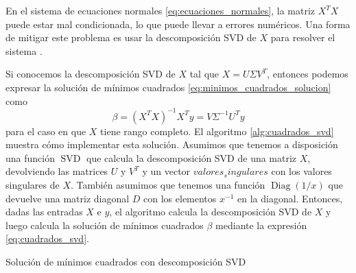 \documentclass{article}
\begin{document}

En el sistema de ecuaciones normales \ref{eq:ecuaciones_normales}, la matriz $X^T X$ puede estar mal condicionada, lo que puede llevar a errores numéricos. Una forma de mitigar este problema es usar la descomposición SVD de $X$ para resolver el sistema \citep{strang2022introduction}. 

Si conocemos la descomposición SVD de $X$ tal que $X = U \Sigma V^T$, entonces podemos expresar la solución de mínimos cuadrados \ref{eq:minimos_cuadrados_solucion} como
%
\begin{equation} \label{eq:cuadrados_svd}
    \beta = (X^T X)^{-1} X^T y = V \Sigma^{-1} U^T y
\end{equation}
%
para el caso en que $X$ tiene rango completo. El algoritmo \ref{alg:cuadrados_svd} muestra cómo implementar esta solución. Asumimos que tenemos a disposición una función $\operatorname{SVD}$ que calcula la descomposición SVD de una matriz $X$, devolviendo las matrices $U$ y $V^T$ y un vector $valores_singulares$ con los valores singulares de $X$. También asumimos que tenemos una función $\operatorname{Diag}(1/x)$ que devuelve una matriz diagonal $D$ con los elementos $x^{-1}$ en la diagonal. Entonces, dadas las entradas $X$ e $y$, el algoritmo calcula la descomposición SVD de $X$ y luego calcula la solución de mínimos cuadrados $\beta$ mediante la expresión \ref{eq:cuadrados_svd}.

\begin{algorithm}[!ht]
    \caption{
        Solución de mínimos cuadrados con descomposición SVD
    } 
    \label{alg:cuadrados_svd}
    \begin{algorithmic}
     
    \end{algorithmic}
\end{algorithm}


\end{document}
